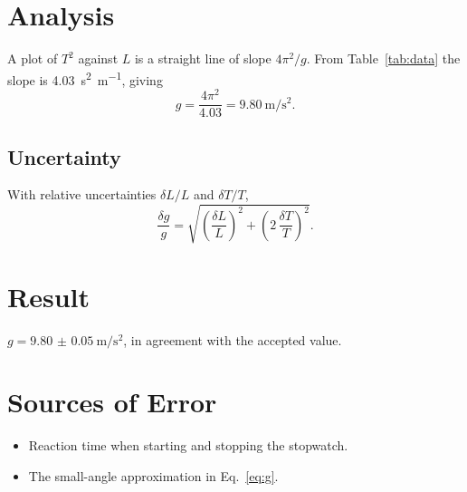 \documentclass[11pt,a4paper]{article}
\begin{document}
\section{Analysis}
A plot of $T^{2}$ against $L$ is a straight line of slope $4\pi^{2}/g$.
From Table~\ref{tab:data} the slope is \qty{4.03}{\second\squared\per\metre}, giving
\[
  g = \frac{4\pi^{2}}{4.03} = \qty{9.80}{\metre\per\second\squared}.
\]

\subsection{Uncertainty}
With relative uncertainties $\delta L / L$ and $\delta T / T$,
\[
  \frac{\delta g}{g} = \sqrt{\left(\frac{\delta L}{L}\right)^{2} + \left(2\,\frac{\delta T}{T}\right)^{2}}.
\]

\section{Result}
$g = \qty{9.80(5)}{\metre\per\second\squared}$, in agreement with the accepted value.

\section{Sources of Error}
\begin{itemize}
  \item Reaction time when starting and stopping the stopwatch.
  \item The small-angle approximation in Eq.~\eqref{eq:g}.
\end{itemize}
\end{document}
